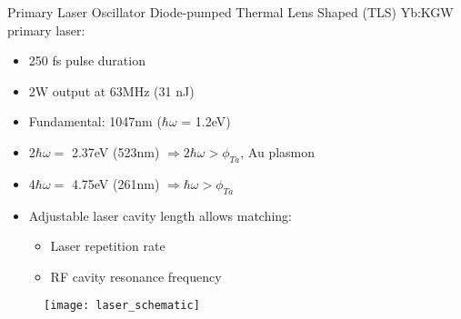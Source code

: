 \begin{frame}{Primary Laser Oscillator}
  Diode-pumped Thermal Lens Shaped (TLS) Yb:KGW primary laser:
  \begin{itemize}
    \item<2-> 250 fs pulse duration
    \item<3-> 2W output at 63MHz (31 nJ)
    \item<4-> Fundamental: 1047nm ($\hbar \omega$ = 1.2eV)
    \item<5-> 2$\hbar \omega = $ 2.37eV (523nm) $\Rightarrow 2 \hbar \omega > \phi_{{\scriptscriptstyle Ta}}$, Au plasmon
    \item<6-> 4$\hbar \omega = $ 4.75eV (261nm) $\Rightarrow   \hbar \omega > \phi_{{\scriptscriptstyle Ta}}$
    \item<7-> Adjustable laser cavity length allows matching:
    \begin{itemize}
      \item<7-> Laser repetition rate
      \item<7-> RF cavity resonance frequency
    \end{itemize}
  \end{itemize}
  \begin{figure}
    \centering
    \texttt{[image: laser\_schematic]}
  \end{figure}
\end{frame}

